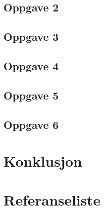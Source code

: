 \documentclass{article}
\begin{document}
\subsection{Oppgave 2} %
\label{sub:oppgave_2}

\clearpage


\subsection{Oppgave 3} %
\label{sub:oppgave_3}

\newpage


\subsection{Oppgave 4} %
\label{sub:oppgave_4}

\newpage


\subsection{Oppgave 5} %
\label{sub:oppgave_5}

\clearpage


\subsection{Oppgave 6} %
\label{sub:oppgave_6}

\clearpage




\section{Konklusjon} %
\label{sec:konklusjon}

\newpage

\newpage
\section{Referanseliste}

\end{document}
